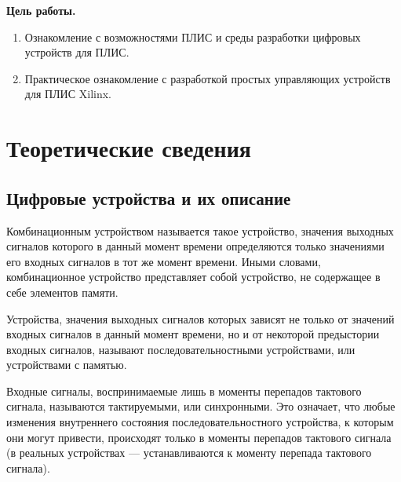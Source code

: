 \def \eng #1{\foreignlanguage{english}{#1}}

\noindent\textbf{Цель работы.}
\begin{enumerate}
\item Ознакомление с возможностями ПЛИС и среды разработки цифровых устройств для ПЛИС.
\item Практическое ознакомление с разработкой простых управляющих устройств для ПЛИС \eng{Xilinx}.
\end{enumerate}

\section{Теоретические сведения}

\subsection{Цифровые устройства и их описание}

Комбинационным устройством называется такое устройство, значения выходных сигналов которого в данный момент времени определяются только значениями его входных сигналов в тот же момент времени. Иными словами, комбинационное устройство представляет собой устройство, не содержащее в себе элементов памяти.

Устройства, значения выходных сигналов которых зависят не только от значений входных сигналов в данный момент времени, но и от некоторой предыстории входных сигналов, называют последовательностными устройствами, или устройствами с памятью.


Входные сигналы, воспринимаемые лишь в моменты перепадов тактового сигнала, называются тактируемыми, или синхронными. Это означает, что любые изменения внутреннего состояния последовательностного устройства, к которым они могут привести, происходят только в моменты перепадов тактового сигнала (в реальных устройствах --- устанавливаются к моменту перепада тактового сигнала).

